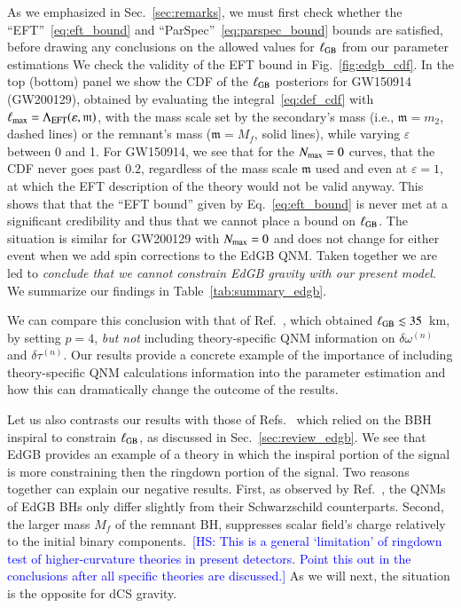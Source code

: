 \documentclass[twocolumn,
               prd,
               aps,
               superscriptaddress,
               tightenlines,
               nofootinbib,
               eqsecnum,
               amsfonts,
               amsmath,
               longbibliography]{revtex4-1}
\newcommand{\hs}[1]{{\textcolor{blue}{{[HS: #1]}} }}
\begin{document}
As we emphasized in Sec.~\ref{sec:remarks}, we must first check whether the
``EFT''~\eqref{eq:eft_bound} and ``ParSpec''~\eqref{eq:parspec_bound} bounds
are satisfied, before drawing any conclusions on the allowed values for
$\ell_{\rm GB}$ from our parameter estimations
%
We check the validity of the EFT bound in Fig.~\ref{fig:edgb_cdf}. In the top (bottom) panel we show
the CDF of the $\ell_{\rm GB}$ posteriors for GW150914 (GW200129), obtained
by evaluating the integral~\eqref{eq:def_cdf} with $\ell_{\rm max} = \Lambda_{\rm EFT}(\varepsilon, \mathfrak{m})$,
with the mass scale set by the secondary's mass (i.e., $\mathfrak{m} = m_2$, dashed lines) or
the remnant's mass ($\mathfrak{m} = M_f$, solid lines), while varying $\varepsilon$ between 0 and 1.
%
For GW150914, we see that for the $N_{\rm max} = 0$ curves, that the CDF never goes
past $0.2$, regardless of the mass scale $\mathfrak{m}$ used and even at $\varepsilon =
1$, at which the EFT description of the theory would not be valid anyway.
%
This shows that that the ``EFT bound'' given by Eq.~\eqref{eq:eft_bound} is
never met at a significant credibility and thus that we cannot place a bound on
$\ell_{\rm GB}$.
%
The situation is similar for GW200129 with $N_{\rm max} = 0$ and does not
change for either event when we add spin corrections to the EdGB QNM.
%
Taken together we are led to \emph{conclude that we cannot constrain EdGB gravity with our
present model}.
%
We summarize our findings in Table~\ref{tab:summary_edgb}.

We can compare this conclusion with that of Ref.~\cite{Carullo:2021dui}, which obtained $\ell_{\rm GB} \lesssim 35$~km,
by setting $p=4$, \emph{but not} including theory-specific QNM information on $\delta \omega^{(n)}$ and $\delta \tau^{(n)}$.
%
Our results provide a concrete example of the importance of including
theory-specific QNM calculations information into the parameter estimation
and how this can dramatically change the outcome of the results.

Let us also contrasts our results with those of Refs.~\cite{Nair:2019iur,Perkins:2021mhb,Lyu:2022gdr}
which relied on the BBH inspiral to constrain $\ell_{\rm GB}$, as discussed in Sec.~\ref{sec:review_edgb}.
%
We see that EdGB provides an example of a theory in which the inspiral portion
of the signal is more constraining then the ringdown portion of the signal.
%
Two reasons together can explain our negative results. First, as observed by
Ref.~\cite{Blazquez-Salcedo:2016enn}, the QNMs of EdGB BHs only differ slightly
from their Schwarzschild counterparts. Second, the larger mass $M_f$ of the
remnant BH, suppresses scalar field's charge relatively to the initial binary
components.~\hs{This is a general `limitation' of ringdown test of higher-curvature theories in present detectors.
Point this out in the conclusions after all specific theories are discussed.}
%
As we will next, the situation is the opposite for dCS gravity.
\end{document}
